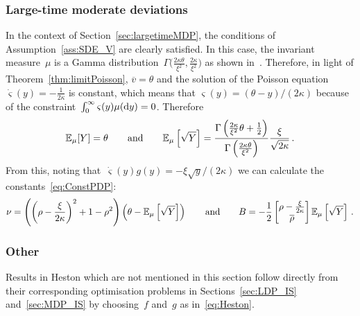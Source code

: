 \subsubsection{Large-time moderate deviations} 
In the context of Section~\ref{sec:largetimeMDP}, 
the conditions of Assumption~\ref{ass:SDE_V} are clearly satisfied. 
In this case, the invariant measure~$\mu$ is a Gamma distribution~$\Gamma\big(\frac{2\kappa\theta}{\xi^2}, \frac{2\kappa}{\xi^2}\big)$ 
as shown in~\cite[Section~3.]{Cox1985ARates}.
Therefore, in light of Theorem~\ref{thm:limitPoisson}, 
$\overline{v} = \theta$ and the solution of the Poisson equation~$\dot{\varsigma}(y)=-\frac{1}{2\kappa}$ is constant, which means
that
$\varsigma(y) = (\theta-y)/(2\kappa)$
because of the constraint~$\int_{0}^{\infty}\varsigma(y)\mu(\mathrm{d} y)=0$.
Therefore 
$$
\mathbb{E}_\mu[Y] = \theta
\qquad\text{and}\qquad
\mathbb{E}_\mu\left[\sqrt{Y}\right]
=\frac{\Gamma\left( \frac{2\kappa}{\xi^2}\theta + \frac{1}{2} \right )}{\Gamma\left( \frac{2\kappa\theta}{\xi^2} \right )} \frac{\xi}{\sqrt{2\kappa}}\,.
$$
From this, noting that~$\dot{\varsigma}(y)g(y) = -\xi\sqrt{y}/(2\kappa)$ we can calculate the constants~\eqref{eq:ConstPDP}:
\begin{align*}
\nu = \left( \left( \rho - \frac{\xi}{2\kappa} \right)^2 + 1-\rho^2 \right)\left( \theta - \mathbb{E}_\mu\left[\sqrt{Y}\right]\right)
\qquad \text{and} \qquad
B = -\frac{1}{2}
\begin{bmatrix}
\rho - \frac{\xi}{2\kappa}\\
\overline{\rho}\\
\end{bmatrix}\mathbb{E}_\mu\left[\sqrt{Y}\right]\,.
\end{align*}

\subsubsection{Other}
Results in Heston which are not mentioned in this section follow directly from their corresponding optimisation problems in Sections~\ref{sec:LDP_IS} and~\ref{sec:MDP_IS} by choosing~$f$ and~$g$ as in~\eqref{eq:Heston}.

